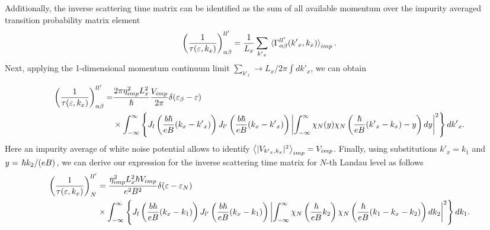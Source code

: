 \documentclass[
 reprint,
 amsmath,amssymb,
 aps,
 prb,
]{revtex4-2}
\begin{document}
\begin{appendix}
Additionally, the inverse scattering time matrix can be identified as the sum of all available momentum over the impurity averaged transition probability matrix element \cite{wackerl20,wackerlthesis20}
\begin{equation} \label{eq:41}
    \left(\frac{1}{\tau(\varepsilon,k_x)} \right)^{ll'}_{\alpha\beta} =
    \frac{1}{L_x} \sum_{{k'}_x}
    \expval**{\Gamma_{\alpha\beta}^{ll'}({k'}_x,k_x)}_{imp}.
\end{equation}
Next, applying the 1-dimensional momentum continuum limit $\sum_{{k'}_x} \longrightarrow {L_x}/{2\pi}\int d {k'}_x$, we can obtain
\begin{widetext}
\begin{equation} \label{eq:42}
  \begin{aligned}
    \left(\frac{1}{\tau(\varepsilon,k_x)}\right)^{ll'}_{\alpha\beta} = &
    \frac { 2\pi \eta_{imp}^2 L_x^2}{ \hbar}
    \frac{V_{imp}}{2\pi}
    \delta(\varepsilon_{\beta} - \varepsilon) \\
    & \times
    \int_{-\infty}^{\infty} \left\{
    J_l\bm{\left(}\frac{b\hbar}{eB}({k}_x - {k'}_x)\bm{\right)}
    J_{l'}\bm{\left(}\frac{b\hbar}{eB}({k}_x - {k'}_x)\bm{\right)}
    \left|
    \int_{-\infty}^{\infty}
    {\chi}_N(y)
    {\chi}_N \bm{\left(}\frac{\hbar}{eB} ({k'}_x - {k}_x) - y \bm{\right)} dy\right|^2 \right\} d {k'}_x.
  \end{aligned}
\end{equation}
Here an impurity average of white noise potential allows to identify $\expval{|V_{{k'}_x,k_x}|^2}_{imp} = V_{imp}$.
Finally, using substitutions $k'_x = k_1$ and $y = \flatfrac{\hbar{k_2}}{(eB)}$, we can derive our expression for the inverse scattering time matrix for $N$-th Landau
level as follows
\begin{equation} \label{eq:43}
  \begin{aligned}
    \left(\frac{1}{\tau(\varepsilon,k_x)}\right)^{ll'}_{N} &=
    \frac { \eta_{imp}^2 L_x^2 \hbar V_{imp}}{e^2B^2}
    \delta(\varepsilon - \varepsilon_{N}) \\
    & \times
    \int_{-\infty}^{\infty} \left\{
    J_l\bm{\left(}\frac{b\hbar}{eB}({k}_x - k_1)\bm{\right)}
    J_{l'}\bm{\left(}\frac{b\hbar}{eB}({k}_x - k_1)\bm{\right)}
    \left|
    \int_{-\infty}^{\infty}
    {\chi}_N\left(\frac{\hbar}{eB}k_2 \right)
    {\chi}_N \bm{\left(}\frac{\hbar}{eB} (k_1 - k_x - k_2) \bm{\right)} dk_2 \right|^2 \right\} d k_1.
  \end{aligned}
\end{equation}
\end{widetext}


\end{appendix}
\end{document}
